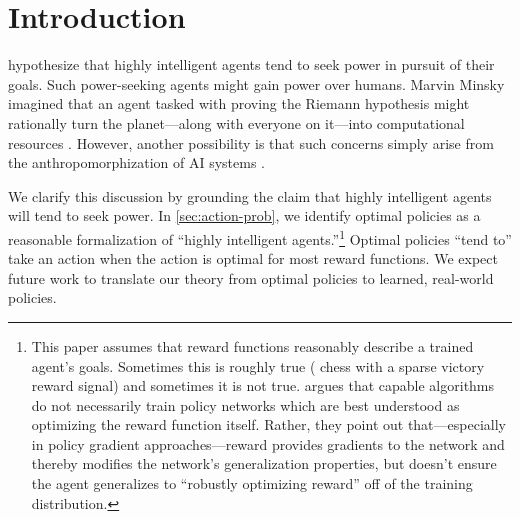 \begin{abstract}
Some researchers speculate that intelligent reinforcement learning ({\rl}) agents would be incentivized to seek resources and power in pursuit of the objectives we specify for them. Other researchers point out that {\rl} agents need not have human-like power-seeking instincts. To clarify this discussion, we develop the first formal theory of the statistical tendencies of optimal policies. In the context of Markov decision processes ({\mdp}s), we prove that certain environmental symmetries are sufficient for optimal policies to tend to seek power over the environment. These symmetries exist in many environments in which the agent can be shut down or destroyed. We prove that in these environments, most reward functions make it optimal to seek power by keeping a range of options available and, when maximizing average reward, by navigating towards larger sets of potential terminal states.
\end{abstract}

\section{Introduction} 
\citet{omohundro_basic_2008,bostrom_superintelligence_2014,russell_human_2019} hypothesize that highly intelligent agents tend to seek power in pursuit of their goals. Such power-seeking agents might gain power over humans. Marvin Minsky imagined that an agent tasked with proving the Riemann hypothesis might rationally turn the planet—along with everyone on it—into computational resources \citep{russell_artificial_2009}. However, another possibility is that such concerns simply arise from the anthropomorphization of AI systems \citep{lecun_dont_2019,instrumental,steven_2020,mitchell2021ai}.

We clarify this discussion by grounding the claim that highly intelligent agents will tend to seek power. In \cref{sec:action-prob}, we identify optimal policies as a reasonable formalization of ``highly intelligent agents.''\footnote{This paper assumes that reward functions reasonably describe a trained agent's goals. Sometimes this is roughly true (\eg{} chess with a sparse victory reward signal) and sometimes it is not true. \citet{rewardNotOpt} argues that capable {\rl} algorithms do not necessarily train policy networks which are best understood as optimizing the reward function itself. Rather, they point out that—especially in policy gradient approaches—reward provides gradients to the network and thereby modifies the network's generalization properties, but doesn't ensure the agent generalizes to ``robustly optimizing reward'' off of the training distribution.} Optimal policies ``tend to'' take an action when the action is optimal for most reward functions. We expect future work to translate our theory from optimal policies to learned, real-world policies. 

